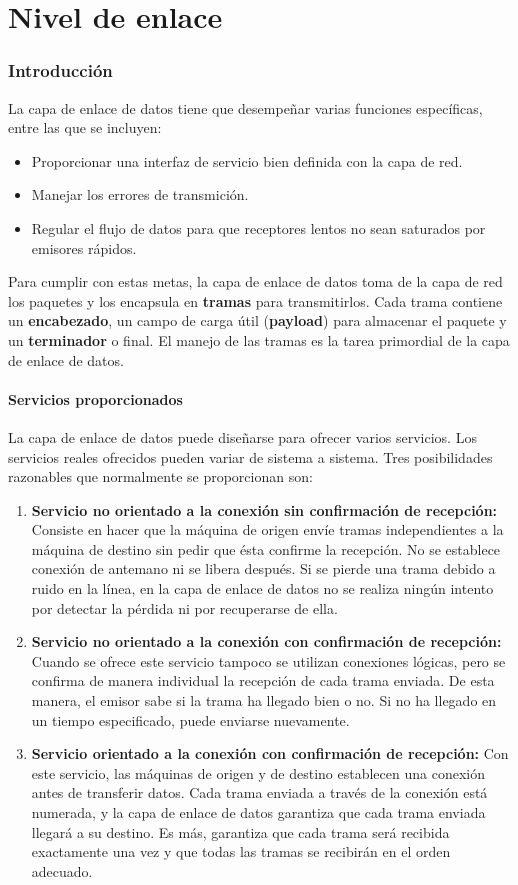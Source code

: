 \part{Nivel de enlace}
\section{Introducción}
La capa de enlace de datos tiene que desempeñar varias funciones específicas, entre las que
se incluyen:
\begin{itemize}
  \item Proporcionar una interfaz de servicio bien definida con la capa de red.
  \item Manejar los errores de transmición.
  \item Regular el flujo de datos para que receptores lentos no sean saturados por emisores rápidos.
\end{itemize}
Para cumplir con estas metas, la capa de enlace de datos toma de la capa de red los paquetes y los encapsula en \textbf{tramas} para transmitirlos. Cada trama contiene un \textbf{encabezado}, un campo de carga útil (\textbf{payload}) para almacenar el paquete y un \textbf{terminador} o final. El manejo de las tramas es la tarea primordial de la capa de enlace de datos.

\subsection{Servicios proporcionados}
La capa de enlace de datos puede diseñarse para ofrecer varios servicios. Los servicios reales
ofrecidos pueden variar de sistema a sistema. Tres posibilidades razonables que normalmente se
proporcionan son:
\begin{enumerate}
  \item \textbf{Servicio no orientado a la conexión sin confirmación de recepción:} Consiste en hacer que la máquina de origen envíe tramas independientes a la máquina de destino sin pedir que ésta confirme la recepción. No se establece conexión de antemano ni se libera después. Si se pierde una trama debido a ruido en la línea, en la capa de enlace de datos no se realiza ningún intento por detectar la pérdida ni por recuperarse de ella.
  \item \textbf{Servicio no orientado a la conexión con confirmación de recepción:} Cuando se ofrece este servicio tampoco se utilizan conexiones lógicas, pero se confirma de manera individual la recepción de cada trama enviada. De esta manera, el emisor sabe si la trama ha llegado bien o no. Si no ha llegado en un tiempo especificado, puede enviarse nuevamente.
  \item \textbf{Servicio orientado a la conexión con confirmación de recepción:} Con este servicio, las máquinas de origen y de destino establecen una conexión antes de transferir datos. Cada trama enviada a través de la conexión está numerada, y la capa de enlace de datos garantiza que cada trama enviada llegará a su destino. Es más, garantiza que cada trama será recibida exactamente una vez y que todas las tramas se recibirán en el orden adecuado.
\end{enumerate}


